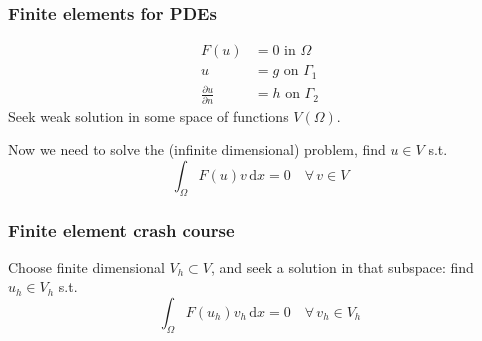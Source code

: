\documentclass[presentation]{beamer}
\begin{document}
\begin{frame}
  \frametitle{Finite elements for PDEs}
  \begin{align*}
    F(u) &= 0 \text{ in $\Omega$}\\
    u &= g \text{ on $\Gamma_1$}\\
    \frac{\partial u}{\partial n} &= h \text{ on $\Gamma_2$}
  \end{align*}
  Seek weak solution in some space of functions $V(\Omega)$.

  Now we need to solve the (infinite dimensional) problem, find $u\in V$ s.t.
  \begin{equation*}
    \int_\Omega \!F(u) v\, \text{d}x = 0 \quad \forall\, v \in V
  \end{equation*}
\end{frame}
\begin{frame}
  \frametitle{Finite element crash course}
  Choose finite dimensional $V_h \subset V$, and seek a solution in
  that subspace: find $u_h \in V_h$ s.t.
  \begin{equation*}
    \int_\Omega \!F(u_h) v_h\, \text{d}x = 0 \quad \forall\, v_h \in V_h
  \end{equation*}
\end{frame}
\end{document}
